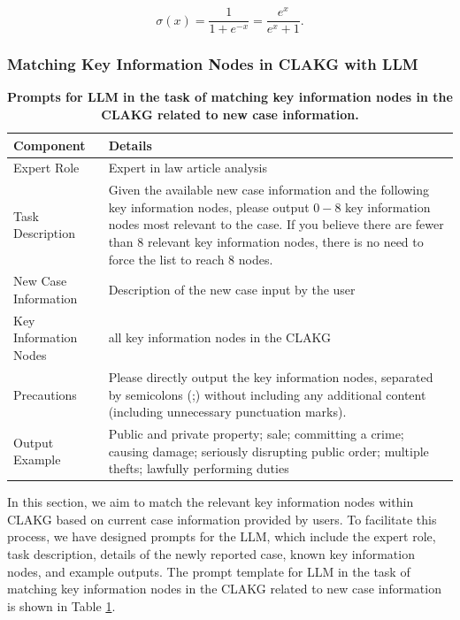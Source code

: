\documentclass[review,times,nonatbib]{elsarticle} %
\begin{document}
\begin{equation}
\label{equa_4}
\sigma(x)=\frac{1}{1+e^{-x}}=\frac{e^x}{e^x+1}.
\end{equation}




\subsubsection{Matching Key Information Nodes in CLAKG with LLM}
\label{subsec322}
\begin{table}[h]
\caption{\textbf{Prompts for LLM in the task of matching key information nodes in the CLAKG related to new case information.}}
\label{match_key_inf}
\setlength{\tabcolsep}{4pt}
\begin{tabular}{m{}|m{}}
 \textbf{Component} & \textbf{Details} \\
\hline Expert Role & Expert in law article analysis \\
\hline Task Description & 
Given the available new case information and the 
following key information nodes, please output $0-8$ key
information nodes most relevant to the case. If you 
believe there are fewer than 8 relevant key information 
nodes, there is no need to force the list to reach 8 nodes.
 \\
\hline New Case Information & Description of the new case input by the user \\
\hline Key Information Nodes & all key information nodes in the CLAKG\\ 
\hline Precautions & 
Please directly output the key information nodes, separated 
by semicolons (;) without including any additional content 
(including unnecessary punctuation marks).
 \\
\hline Output Example & 
Public and private property; sale; committing 
a crime; causing damage; seriously disrupting public order; 
multiple thefts; lawfully performing duties
 \\
\end{tabular}
\end{table}
In this section, we aim to match the relevant key information nodes within CLAKG based on current case information provided by users. To facilitate this process, we have designed prompts for the LLM, which include the expert role, task description, details of the newly reported case, known key information nodes, and example outputs. The prompt template for LLM in the task of matching key information nodes in the CLAKG related to new case information is shown in Table \ref{match_key_inf}.
\end{document}
